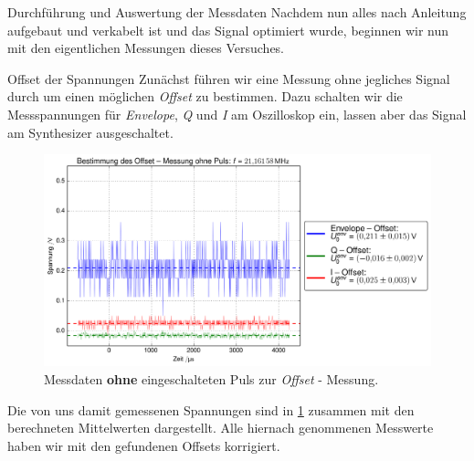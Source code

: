 \documentclass[pdftex, a4paper,11pt, twoside, ngerman]{report}
\begin{document}
  \begin{chapter}{Durchführung und Auswertung der Messdaten}
    \label{chp:Auswertung}
    Nachdem nun alles nach Anleitung aufgebaut und verkabelt ist und das Signal
    optimiert wurde, beginnen wir nun mit den eigentlichen Messungen dieses
    Versuches.
    
    \begin{section}{Offset der Spannungen}
      \label{chpOffset}
      Zunächst führen wir eine Messung ohne jegliches Signal durch um einen
      möglichen \textit{Offset} zu bestimmen.
      Dazu schalten wir die Messspannungen für \textit{Envelope}, \textit{Q} und
      \textit{I} am Oszilloskop ein, lassen aber das Signal am Synthesizer
      ausgeschaltet.
      \begin{figure}[hb]
        \centering
        \includegraphics[width=1\textwidth]{Figures/Offset.png}
        \caption{Messdaten \textbf{ohne} eingeschalteten Puls zur
          \textit{Offset} - Messung.}
        \label{figOffset}
      \end{figure}

      Die von uns damit gemessenen Spannungen sind in \cref{figOffset} zusammen
      mit den berechneten Mittelwerten dargestellt.
      Alle hiernach genommenen Messwerte haben wir mit den gefundenen
      Offsets korrigiert.
      
    \end{section}
    
    
    

\end{chapter}
\end{document}
